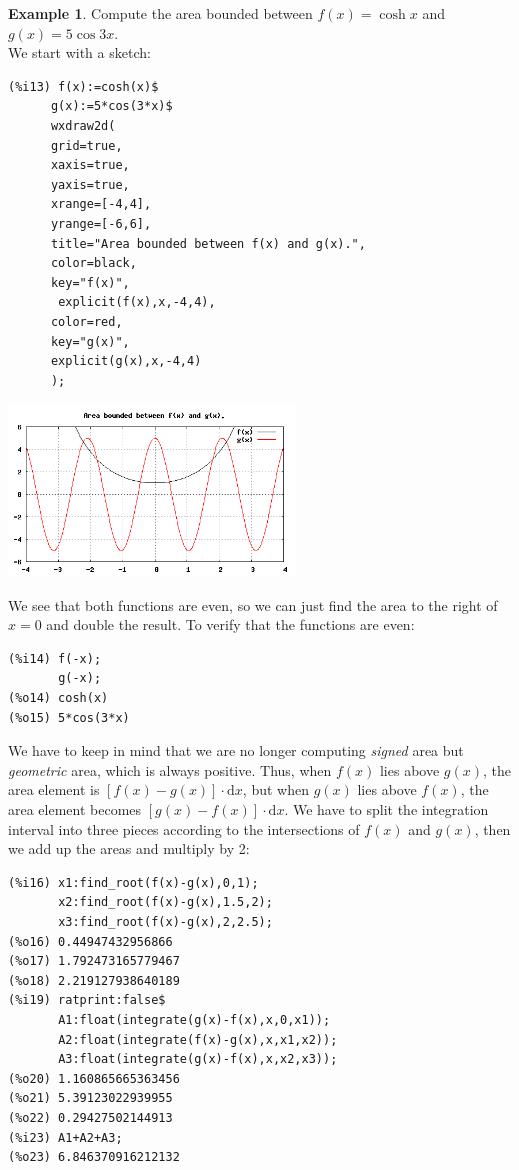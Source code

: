 \documentclass[10.5pt,twoside]{report}
\theoremstyle{definition}
\newtheorem{exmp}{Example}[section]
\begin{document}
\begin{exmp}  Compute the area bounded between $f(x)=\cosh{x}$ and $g(x)=5 \cos{3x}$.\\

We start with a sketch:

\begin{verbatim}
(%i13) f(x):=cosh(x)$
      g(x):=5*cos(3*x)$
      wxdraw2d(
      grid=true,
      xaxis=true,
      yaxis=true,
      xrange=[-4,4], 
      yrange=[-6,6],
      title="Area bounded between f(x) and g(x).",
      color=black,
      key="f(x)",
       explicit(f(x),x,-4,4),
      color=red,
      key="g(x)",
      explicit(g(x),x,-4,4)
      );
\end{verbatim}

\includegraphics[width=3in]{example_7_3_1_3_1}


We see that both functions are even, so we can just find the area to the right of $x=0$ and double the result.  To verify that the functions are even:

\begin{verbatim}
(%i14) f(-x);
       g(-x);
(%o14) cosh(x)
(%o15) 5*cos(3*x)
\end{verbatim}

We have to keep in mind that we are no longer computing \textit{signed} area but \textit{geometric} area, which is always positive.  Thus, when $f(x)$ lies above $g(x)$, the area element is $[f(x)-g(x)]\cdot \mathrm{d}x$, but when $g(x)$ lies above $f(x)$, the area element becomes $[g(x)-f(x)]\cdot \mathrm{d}x$.  We have to split the integration interval into three pieces according to the intersections of $f(x)$ and $g(x)$, then we add up the areas and multiply by 2:

\begin{verbatim}
(%i16) x1:find_root(f(x)-g(x),0,1);
       x2:find_root(f(x)-g(x),1.5,2);
       x3:find_root(f(x)-g(x),2,2.5);
(%o16) 0.44947432956866
(%o17) 1.792473165779467
(%o18) 2.219127938640189
(%i19) ratprint:false$
       A1:float(integrate(g(x)-f(x),x,0,x1));
       A2:float(integrate(f(x)-g(x),x,x1,x2));
       A3:float(integrate(g(x)-f(x),x,x2,x3));
(%o20) 1.160865665363456
(%o21) 5.39123022939955
(%o22) 0.29427502144913
(%i23) A1+A2+A3;
(%o23) 6.846370916212132


\end{verbatim}
\end{exmp}
\end{document}
